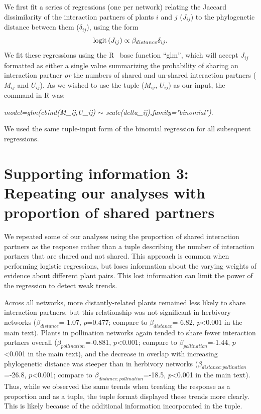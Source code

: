 \documentclass[12pt]{article}
\begin{document}
\begin{spacing}{1.5}
    
    We first fit a series of regressions (one per network) relating the Jaccard dissimilarity of the interaction partners of plants $i$ and $j$ ($J_{ij}$) to the phylogenetic  distance between them ($\delta_{ij}$), using the form
      \begin{equation}
        {\rm logit}\left(J_{ij}\right) \propto \beta_{distance}\delta_{ij} .
        \label{basic}
      \end{equation}
    We fit these regressions using the R~\citep{R} base function ``glm'', which will accept $J_{ij}$ formatted as either a single value summarizing the probability of sharing an interaction partner \emph{or} the numbers of shared and un-shared interaction partners ($M_{ij}$ and $U_{ij}$). As we wished to use the tuple ($M_{ij}$, $U_{ij}$) as our input, the command in R was:


    \emph{model=glm(cbind(M\_ij,U\_ij) $\sim$ scale(delta\_ij),family="binomial")}.


    We used the same tuple-input form of the binomial regression for all subsequent regressions.


\clearpage


\section*{Supporting information 3: Repeating our analyses with proportion of shared partners}

    We repeated some of our analyses using the proportion of shared interaction partners as the response rather than a tuple describing the number of interaction partners that are shared and not shared. This approach is common when performing logistic regressions, but loses information about the varying weights of evidence about different plant pairs. This lost information can limit the power of the regression to detect weak trends.


    Across all networks, more distantly-related plants remained less likely
    to share interaction partners, but this relationship was not significant 
    in herbivory networks ($\beta_{distance}$=-1.07, $p$=0.477; compare to 
    $\beta_{distance}$=-6.82, $p$\textless0.001 in the main text). Plants in pollination networks again tended to share fewer interaction partners overall ($\beta_{pollination}$=-0.881, $p$\textless0.001; compare to $
    \beta_{pollination}$=-1.44, $p$\textless0.001 in the main text), and the decrease in overlap with increasing phylogenetic distance was steeper than in herbivory networks ($\beta_{distance:pollination}$=-26.8, $p$\textless0.001; compare to $\beta_{distance:pollination}$=-18.5, $p$\textless0.001 in the main text). Thus, while we observed the same trends when treating the response as a proportion and as a tuple, the tuple format displayed these trends more clearly. This is likely because of the additional information incorporated in the tuple.



\end{spacing}
\end{document}
